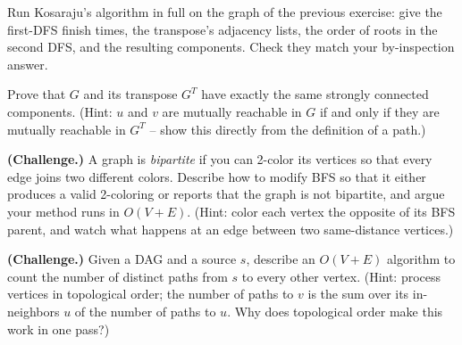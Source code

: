 \begin{exercise}
\label{ch22:ex-scc-trace}
Run Kosaraju's algorithm in full on the graph of the previous exercise: give the
first-DFS finish times, the transpose's adjacency lists, the order of roots in
the second DFS, and the resulting components. Check they match your by-inspection
answer.
\end{exercise}

\begin{exercise}
\label{ch22:ex-transpose-scc}
Prove that $G$ and its transpose $G^{T}$ have exactly the same strongly connected
components. (Hint: $u$ and $v$ are mutually reachable in $G$ if and only if they
are mutually reachable in $G^{T}$ -- show this directly from the definition of a
path.)
\end{exercise}

\begin{exercise}
\label{ch22:ex-bipartite}
\textbf{(Challenge.)} A graph is \emph{bipartite} if you can 2-color its vertices
so that every edge joins two different colors. Describe how to modify BFS so that
it either produces a valid 2-coloring or reports that the graph is not bipartite,
and argue your method runs in $O(V+E)$. (Hint: color each vertex the opposite of
its BFS parent, and watch what happens at an edge between two same-distance
vertices.)
\end{exercise}

\begin{exercise}
\label{ch22:ex-dag-paths}
\textbf{(Challenge.)} Given a DAG and a source $s$, describe an $O(V+E)$
algorithm to count the number of distinct paths from $s$ to every other vertex.
(Hint: process vertices in topological order; the number of paths to $v$ is the
sum over its in-neighbors $u$ of the number of paths to $u$. Why does topological
order make this work in one pass?)
\end{exercise}
